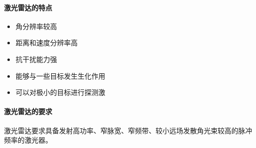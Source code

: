 \paragraph{激光雷达的特点}
\begin{itemize}
	\item 角分辨率较高
	\item 距离和速度分辨率高
	\item 抗干扰能力强
	\item 能够与一些目标发生生化作用
	\item 可以对极小的目标进行探测激
\end{itemize}

\paragraph{激光雷达的要求} 激光雷达要求具备发射高功率、窄脉宽、窄频带、较小远场发散角光束较高的脉冲频率的激光器。

